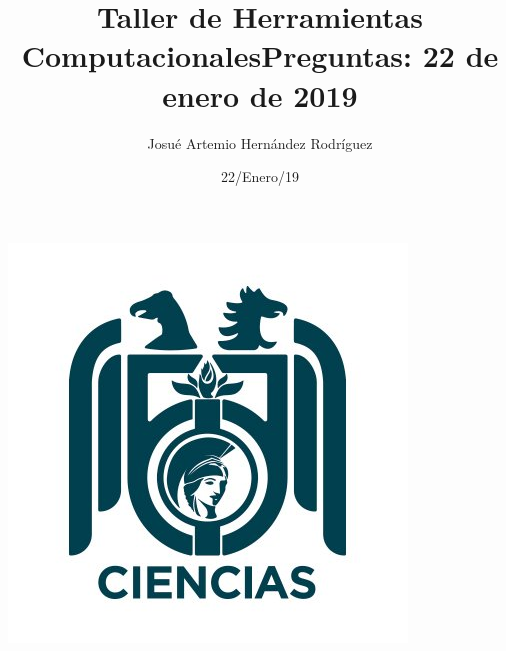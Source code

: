 \documentclass[letterpaper, 12pt, oneside]{article}%
\title{\Huge Taller de Herramientas Computacionales}
\author{Josué Artemio Hernández Rodríguez}%
\date{22/Enero/19}%
\begin{document}
\maketitle
\begin{center}%
\includegraphics[scale=.6]{3.jpg}%
\end{center}%
\newpage%

\title{\huge Preguntas: 22 de enero de 2019\\}%
\end{document}
